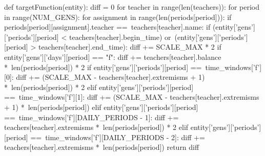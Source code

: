 \documentclass[12pt,a4paper]{report}
\begin{document}
\begin{python}
def targetFunction(entity):
    diff = 0
    for teacher in range(len(teachers)):
        for period in range(NUM_GENS):
            for assignment in range(len(periods[period])):
                if periods[period][assignment].teacher ==\
                   teachers[teacher].name:
                    if (entity['gens']['periods'][period] < 
                       teachers[teacher].begin_time) or\
                       (entity['gens']['periods'][period] > 
                       teachers[teacher].end_time):
                        diff += SCALE_MAX * 2
                    if entity['gens']['days'][period] == "f":
                        diff += teachers[teacher].balance *\
                            len(periods[period]) * 2
                    if entity['gens']['periods'][period] ==\
                       time_windows['f'][0]:
                        diff += (SCALE_MAX - 
                            teachers[teacher].extremisms + 1) *\
                            len(periods[period]) * 2
                    elif entity['gens']['periods'][period] ==\
                       time_windows['f'][1]:
                        diff += (SCALE_MAX - 
                            teachers[teacher].extremisms + 1) *\
                            len(periods[period])
                    elif entity['gens']['periods'][period] ==\
                       time_windows['f'][DAILY_PERIODS - 1]:
                        diff += teachers[teacher].extremisms *\
                            len(periods[period]) * 2
                    elif entity['gens']['periods'][period] ==\
                       time_windows['f'][DAILY_PERIODS - 2]:
                        diff += teachers[teacher].extremisms *\
                            len(periods[period])
    return diff
\end{python}
\end{document}
